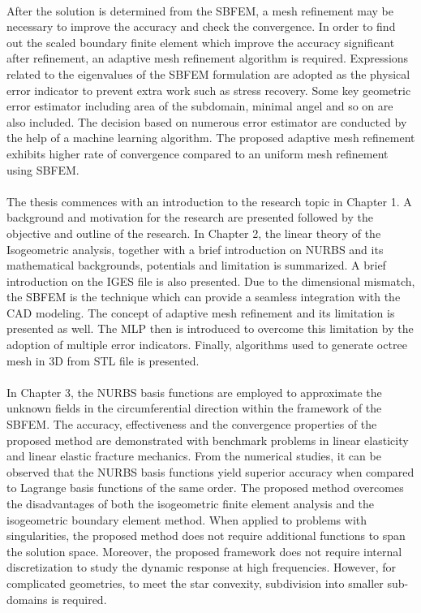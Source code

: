 \paragraph{}
After the solution is determined from the SBFEM, a mesh refinement may be necessary to improve the accuracy and check the convergence.
In order to find out the scaled boundary finite element which improve the accuracy significant after refinement, an adaptive mesh refinement algorithm is required.
Expressions related to the eigenvalues of the SBFEM formulation are adopted as the physical error indicator to prevent extra work such as stress recovery.
Some key geometric error estimator including area of the subdomain, minimal angel and so on are also included.
The decision based on numerous error estimator are conducted by the help of a machine learning algorithm.
The proposed adaptive mesh refinement exhibits higher rate of convergence compared to an uniform mesh refinement using SBFEM.

\paragraph{}
The thesis commences with an introduction to the research topic in Chapter 1.
A background and motivation for the research are presented followed by the objective and outline of the research.
In Chapter 2, the linear theory of the Isogeometric analysis, together with a brief introduction on NURBS and its mathematical backgrounds, potentials and limitation is summarized.
A brief introduction on the IGES file is also presented.
Due to the dimensional mismatch, the SBFEM is the technique which can provide a seamless integration with the CAD modeling.
The concept of adaptive mesh refinement and its limitation is presented as well.
The MLP then is introduced to overcome this limitation by the adoption of multiple error indicators.
Finally, algorithms used to generate octree mesh in 3D from STL file is presented.

\paragraph{}
In Chapter 3, the NURBS basis functions are employed to approximate the unknown fields in the circumferential direction within the framework of the SBFEM.
The accuracy, effectiveness and the convergence properties of the proposed method are demonstrated with benchmark problems in linear elasticity and linear elastic fracture mechanics.
From the numerical studies, it can be observed that the NURBS basis functions yield superior accuracy when compared to Lagrange basis functions of the same order.
The proposed method overcomes the disadvantages of both the isogeometric finite element analysis and the isogeometric boundary element method. 
When applied to problems with singularities, the proposed method does not require additional functions to span the solution space.
Moreover, the proposed framework does not require internal discretization to study the dynamic response at high frequencies.
However, for complicated geometries, to meet the star convexity, subdivision into smaller sub-domains is required.

